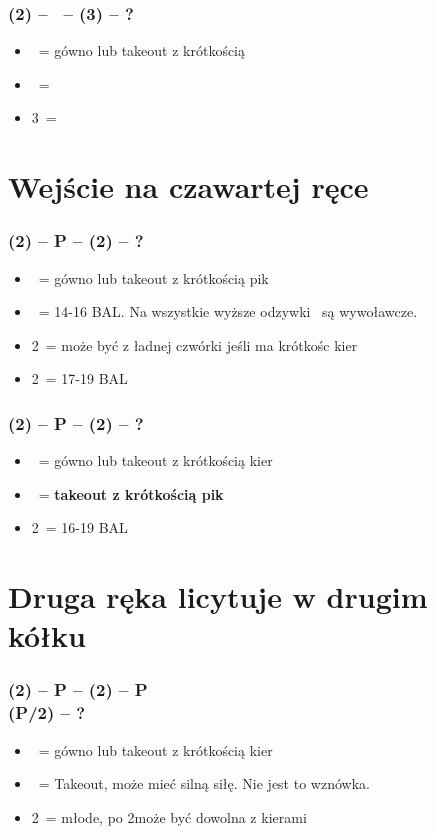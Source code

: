\documentclass[12pt, a4paper]{article}
\begin{document}
\subsubsection*{(2\diams) -- \dbl\ -- (3\hearts) -- ?}
\begin{itemize}
    \item \pass\ = gówno lub takeout z krótkością \spades
    \item \dbl\ = \gf\
    \item 3\spades\ = \gf
\end{itemize}



\pagebreak
\section{Wejście na czawartej ręce}

\subsubsection*{(2\diams) -- P -- (2\hearts) -- ?}
\begin{itemize}
    \item \pass\ = gówno lub takeout z krótkością pik
    \item \dbl\ = 14-16 BAL. Na wszystkie wyższe odzywki \dbl\ są wywoławcze.
    \item 2\spades\ = może być z ładnej czwórki jeśli ma krótkośc kier
    \item 2\nt\ = 17-19 BAL
\end{itemize}


\subsubsection*{(2\diams) -- P -- (2\spades) -- ?}
\begin{itemize}
    \item \pass\ = gówno lub takeout z krótkością kier
    \item \dbl\ = \textbf{takeout z krótkością pik} \imp
    \item 2\nt\ = 16-19 BAL \imp
\end{itemize}


\section*{Druga ręka licytuje w drugim kółku}
\subsubsection*{(2\diams) -- P -- (2\hearts) -- P \\ (P/2\spades) -- ?}
\begin{itemize}
    \item \pass\ = gówno lub takeout z krótkością kier
    \item \dbl\ = Takeout, może mieć silną siłę. Nie jest to wznówka.
    \item 2\nt\ = młode, po 2\spades może być dowolna z kierami
\end{itemize}
\end{document}
